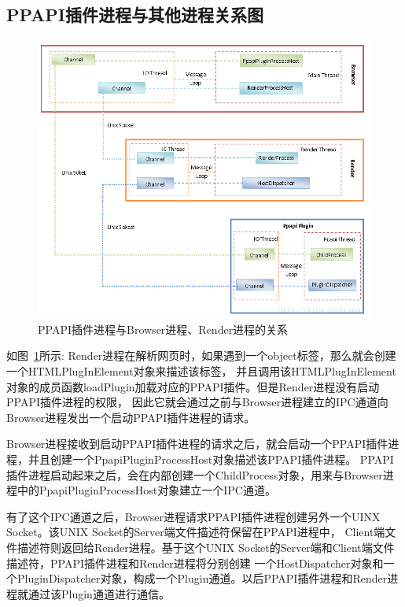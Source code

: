 \subsection{PPAPI插件进程与其他进程关系图}
\begin{figure}[H] 
  \centering 
  \includegraphics[width=\textwidth]{image/ppapi/process.jpg} 
  \caption{PPAPI插件进程与Browser进程、Render进程的关系}
  \label{process_jpg}
\end{figure}

如图~\ref{process_jpg}所示:
Render进程在解析网页时，如果遇到一个object标签，那么就会创建一个HTMLPlugInElement对象来描述该标签，
并且调用该HTMLPlugInElement对象的成员函数loadPlugin加载对应的PPAPI插件。但是Render进程没有启动PPAPI插件进程的权限，
因此它就会通过之前与Browser进程建立的IPC通道向Browser进程发出一个启动PPAPI插件进程的请求。\par
Browser进程接收到启动PPAPI插件进程的请求之后，就会启动一个PPAPI插件进程，并且创建一个PpapiPluginProcessHost对象描述该PPAPI插件进程。
PPAPI插件进程启动起来之后，会在内部创建一个ChildProcess对象，用来与Browser进程中的PpapiPluginProcessHost对象建立一个IPC通道。\par
有了这个IPC通道之后，Browser进程请求PPAPI插件进程创建另外一个UINX Socket。该UNIX Socket的Server端文件描述符保留在PPAPI进程中，
Client端文件描述符则返回给Render进程。基于这个UNIX Socket的Server端和Client端文件描述符，PPAPI插件进程和Render进程将分别创建
一个HostDispatcher对象和一个PluginDispatcher对象，构成一个Plugin通道。以后PPAPI插件进程和Render进程就通过该Plugin通道进行通信。

